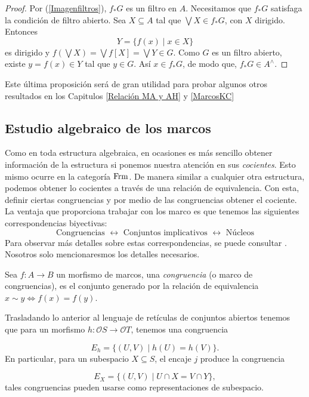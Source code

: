 \begin{proof}
Por (\ref{Imagenfiltros}), $f_*G$ es un filtro en $A$. Necesitamos que $f_*G$ satisfaga la condición de filtro abierto. Sea $X\subseteq A$ tal que $\bigvee X\in f_*G$, con $X$ dirigido. Entonces
\[
Y=\{f(x)\mid x\in X\}
\] 
es dirigido y $f(\bigvee X)=\bigvee f[X]=\bigvee Y\in G$. Como $G$ es un filtro abierto, existe $y=f(x)\in Y$ tal que $y\in G$. Así $x\in f_*G$, de modo que, $f_*G\in A^\wedge$.
\end{proof}

Este última proposición será de gran utilidad para probar algunos otros resultados en los Capitulos \ref{Relación MA y AH} y \ref{MarcosKC}
\subsection{Estudio algebraico de los marcos}\label{E. algebraico}

Como en toda estructura algebraica, en ocasiones es más sencillo obtener información de la estructura si ponemos nuestra atención en sus \emph{cocientes}. Esto mismo ocurre en la categoría $\mathrm{Frm}$. 
De manera similar a cualquier otra estructura, podemos obtener lo cocientes a través de una relación de equivalencia. Con esta, definir ciertas congruencias y por medio de las congruencias obtener 
el cociente.\\

La ventaja que proporciona trabajar con los marco es que tenemos las siguientes correspondencias biyectivas:
\[
\mbox{Congruencias }\leftrightarrow \mbox{ Conjuntos implicativos }\leftrightarrow \mbox{ Núcleos}
\]
Para observar más detalles sobre estas correspondencias, se puede consultar \cite{A.Z.}. Nosotros solo mencionaresmos los detalles necesarios.

\begin{dfn}
Sea $f:A\to B$ un morfismo de marcos, una \emph{congruencia} (o marco de congruencias), es el conjunto generado por la relación de equivalencia $x\sim y\Leftrightarrow f(x)=f(y)$.
\end{dfn}

Trasladando lo anterior al lenguaje de retículas de conjuntos abiertos tenemos que para un morfismo $h\colon \mathcal{O}S\to\mathcal{O}T$, tenemos una congruencia

\[
E_h=\{(U,V)\mid h(U)=h(V)\}.
\]
En particular, para un subespacio $X\subseteq S$, el encaje $j$ produce la congruencia

\[
E_X=\{(U,V)\mid U\cap X=V\cap Y\},
\]
tales congruencias pueden usarse como representaciones de subespacio.\\

